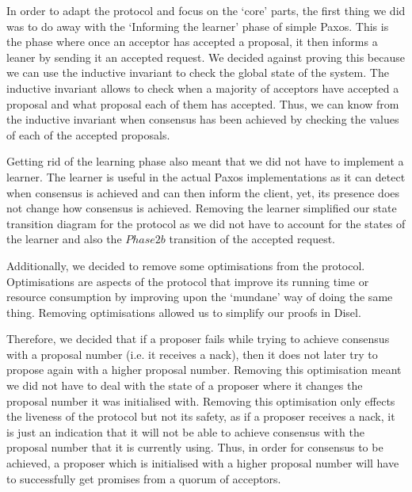 In order to adapt the protocol and focus on the `core' parts, the first thing
we did was to do away with the `Informing the learner' phase of simple Paxos.
This is the phase where once an acceptor has accepted a proposal, it then informs
a leaner by sending it an accepted request. We decided against proving this
because we can use the inductive invariant to check the global state of the system.
The inductive invariant allows to check when a majority of acceptors have
accepted a proposal and what proposal each of them has accepted. Thus, we can know
from the inductive invariant when consensus has been achieved by checking the values
of each of the accepted proposals.

Getting rid of the learning phase also meant that we did not have to implement
a learner.
The learner is useful in the actual Paxos implementations as
it can detect when consensus is achieved and can then inform the client, yet, its
presence does not change how consensus is achieved. Removing the learner simplified
our state transition diagram for the protocol as we did not have to account
for the states of the learner and also the $Phase 2b$ transition of the
accepted request.

Additionally, we decided to remove some optimisations from the protocol.
Optimisations are aspects of the protocol that improve its running time or
resource consumption by improving upon the `mundane' way of doing the same
thing. Removing optimisations allowed us to simplify our proofs in Disel.

Therefore, we decided that if a proposer fails while trying to achieve
consensus with a proposal number (i.e. it receives a nack), then it does not later try
to propose again with a higher proposal number. Removing this optimisation meant we did not
have to deal with the state of a proposer where it changes the proposal number it
was initialised with. Removing this optimisation only
effects the liveness of the protocol but not its safety, as if a proposer
receives a nack, it is just an indication that it will not be able to achieve
consensus with the proposal number that it is currently using. Thus, in order
for consensus to be achieved, a proposer which is initialised with a higher
proposal number will have to successfully get promises from a quorum of acceptors.


